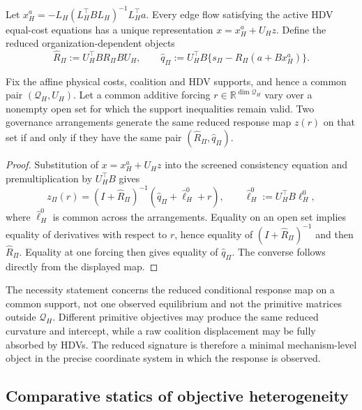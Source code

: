 Let $x_H^a=-L_H(L_H^\top BL_H)^{-1}L_H^\top a$. Every edge flow satisfying the active HDV equal-cost equations has a unique representation $x=x_H^a+U_Hz$. Define the reduced organization-dependent objects
\begin{equation}\label{eq:reduced-activated-signature}
 \widehat R_\Pi:=U_H^\top B R_\Pi B U_H,
 \qquad
 \widehat q_\Pi:=U_H^\top B\{s_\Pi-R_\Pi(a+Bx_H^a)\}.
\end{equation}

\begin{proposition}\label{prop:response-map-minimality}
Fix the affine physical costs, coalition and HDV supports, and hence a common pair $(\mathcal Q_H,U_H)$. Let a common additive forcing $r\in\mathbb R^{\dim\mathcal Q_H}$ vary over a nonempty open set for which the support inequalities remain valid. Two governance arrangements generate the same reduced response map $z(r)$ on that set if and only if they have the same pair $(\widehat R_\Pi,\widehat q_\Pi)$.
\end{proposition}

\begin{proof}
Substitution of $x=x_H^a+U_Hz$ into the screened consistency equation and premultiplication by $U_H^\top B$ gives
\[
 z_\Pi(r)=(I+\widehat R_\Pi)^{-1}(\widehat q_\Pi+\widehat \ell_H^0+r),
 \qquad \widehat \ell_H^0:=U_H^\top B\ell_H^0,
\]
where $\widehat \ell_H^0$ is common across the arrangements. Equality on an open set implies equality of derivatives with respect to $r$, hence equality of $(I+\widehat R_\Pi)^{-1}$ and then $\widehat R_\Pi$. Equality at one forcing then gives equality of $\widehat q_\Pi$. The converse follows directly from the displayed map.
\end{proof}

The necessity statement concerns the reduced conditional response map on a common support, not one observed equilibrium and not the primitive matrices outside $\mathcal Q_H$. Different primitive objectives may produce the same reduced curvature and intercept, while a raw coalition displacement may be fully absorbed by HDVs. The reduced signature is therefore a minimal mechanism-level object in the precise coordinate system in which the response is observed.

\subsection{Comparative statics of objective heterogeneity}\label{sec:comparative-statics}

